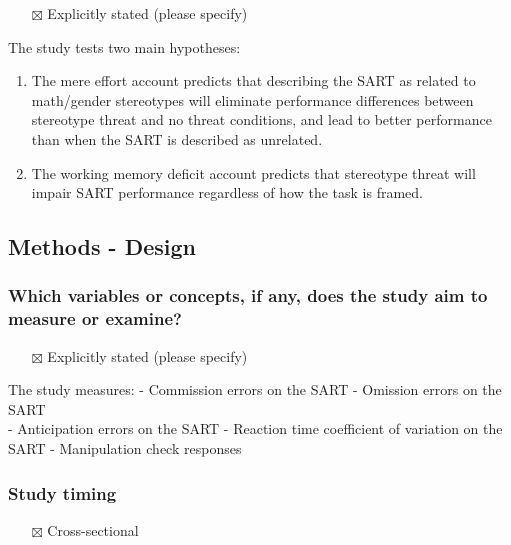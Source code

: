 \documentclass[
  doc, a4paper]{apa7}
\providecommand{\tightlist}{%
  \setlength{\itemsep}{0pt}\setlength{\parskip}{0pt}}
\begin{document}
\begin{itemize}
\tightlist
\item[$\boxtimes$]
  Explicitly stated (please specify)
\end{itemize}

The study tests two main hypotheses:

\begin{enumerate}
\def\labelenumi{\arabic{enumi}.}
\item
  The mere effort account predicts that describing the SART as related to math/gender stereotypes will eliminate performance differences between stereotype threat and no threat conditions, and lead to better performance than when the SART is described as unrelated.
\item
  The working memory deficit account predicts that stereotype threat will impair SART performance regardless of how the task is framed.
\end{enumerate}

\subsection{Methods - Design}\label{methods---design}

\subsubsection{Which variables or concepts, if any, does the study aim to measure or examine?}\label{which-variables-or-concepts-if-any-does-the-study-aim-to-measure-or-examine}

\begin{itemize}
\tightlist
\item[$\boxtimes$]
  Explicitly stated (please specify)
\end{itemize}

The study measures:
- Commission errors on the SART
- Omission errors on the SART\\
- Anticipation errors on the SART
- Reaction time coefficient of variation on the SART
- Manipulation check responses

\subsubsection{Study timing}\label{study-timing}

\begin{itemize}
\tightlist
\item[$\boxtimes$]
  Cross-sectional
\end{itemize}
\end{document}
